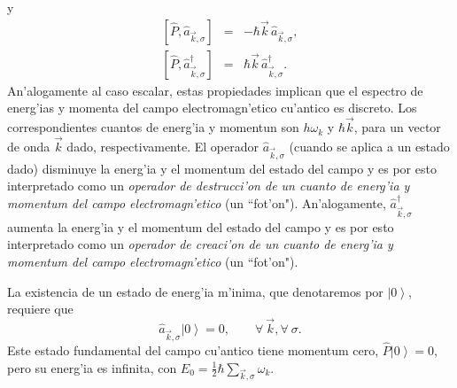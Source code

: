 y
\begin{eqnarray}
\left[ \hat{P},\hat{a}_{\vec{k},\sigma}\right] &=&-\hbar \vec{k}\,
\hat{a}_{\vec{k},\sigma}, \\
\left[ \hat{P},\hat{a}^{\dagger}_{\vec{k},\sigma}\right] &=&\hbar \vec{k}\,
\hat{a}^{\dagger}_{\vec{k},\sigma} \label{compad}.
\end{eqnarray}
An'alogamente al caso escalar, estas propiedades implican que el espectro de
energ'ias y momenta del campo electromagn'etico cu'antico es discreto. Los
correspondientes cuantos de energ'ia y momentun son $h\omega_k$ y $\hbar
\vec{k}$, para un vector de onda $\vec{k}$ dado, respectivamente. El operador
$\hat{a}_{\vec{k},\sigma}$ (cuando se aplica a un estado dado) disminuye la
energ'ia y el momentum del estado del campo y es por esto interpretado como un
\textit{operador de destrucci'on de un cuanto de energ'ia y momentum del campo
electromagn'etico} (un ``fot'on"). An'alogamente,
$\hat{a}^{\dagger}_{\vec{k},\sigma}$ aumenta la energ'ia y el momentum del
estado del campo y es por esto interpretado como un \textit{operador de
creaci'on de un cuanto de energ'ia y momentum del campo electromagn'etico} (un
``fot'on"). 

La existencia de un estado de energ'ia m'inima, que denotaremos por
$\left|0\right>$, requiere que
\begin{equation}
\hat{a}_{\vec{k},\sigma}\left|0\right> =0, \qquad \forall\ \vec{k}, \forall \
\sigma .
\end{equation}
Este estado fundamental del campo cu'antico tiene momentum cero,
$\hat{P}\left|0\right> =0$, pero su energ'ia es infinita, con $E_0=
\frac{1}{2}\hbar\sum_{\vec{k},\sigma} \omega_{k} $.

